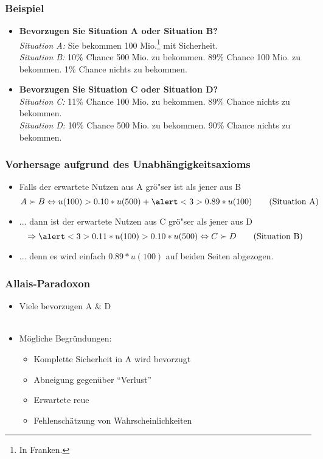 \documentclass{beamer}
\begin{document}
\begin{frame}
  \frametitle{Beispiel \textcite[S. 527]{allais_paradox}}
    \begin{itemize}

  \item \textbf{Bevorzugen Sie Situation A oder Situation B?}\\
  \textit{Situation A:} Sie bekommen 100 Mio.\footnote{In Franken.} mit Sicherheit.\\
  \textit{Situation B:} 10\% Chance 500 Mio. zu bekommen. 89\% Chance 100 Mio. zu bekommen. 1\% Chance nichts zu bekommen. 
  
\item \textbf{Bevorzugen Sie Situation C oder Situation D?}\\
  \textit{Situation C:} 11\% Chance 100 Mio. zu bekommen. 89\% Chance nichts zu bekommen.\\
  \textit{Situation D:} 10\% Chance 500 Mio. zu bekommen. 90\% Chance nichts zu bekommen.
\end{itemize}

\end{frame}

\begin{frame}
  \frametitle{Vorhersage aufgrund des Unabh\"angigkeitsaxioms}
  \begin{itemize}
  \item<1-> Falls der erwartete Nutzen aus A gr\"o"ser ist als jener aus B \begin{equation}\label{eq:6}
     A \succ  B \Leftrightarrow u(100) > 0.10* u(500) + \alert<3>{0.89* u(100)} \tag{Situation A}
   \end{equation}
   
 \item<2-> ... dann ist der erwartete Nutzen aus C gr\"o"ser als jener aus D \begin{equation}
     \label{eq:7}
   \Rightarrow \alert<3>{0.11*u(100)} > 0.10*u(500) \Leftrightarrow C \succ D \tag{Situation B}
 \end{equation}
 
\item<3-> ... denn es wird einfach $0.89*u(100)$ auf beiden Seiten abgezogen.
  \end{itemize}
\end{frame}

\begin{frame}
  \frametitle{Allais-Paradoxon}
  \begin{itemize}
  \item Viele bevorzugen A \& D\\~\\
  \item<2-> M\"ogliche Begr\"undungen:
    \begin{itemize}
    \item Komplette Sicherheit in A wird bevorzugt
    \item Abneigung gegen\"uber "`Verlust"' 
    \item Erwartete reue
    \item Fehlensch\"atzung von Wahrscheinlichkeiten 
    \end{itemize}
  \end{itemize}
\end{frame}
\end{document}
